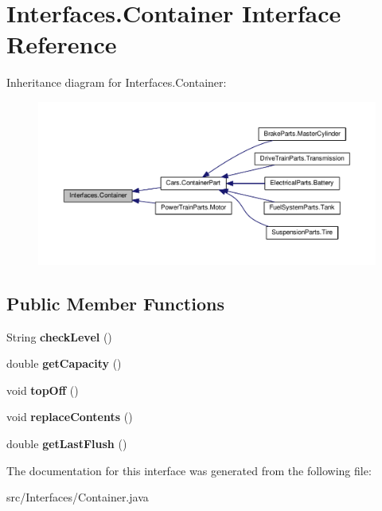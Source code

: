 \hypertarget{interfaceInterfaces_1_1Container}{}\section{Interfaces.\+Container Interface Reference}
\label{interfaceInterfaces_1_1Container}


Inheritance diagram for Interfaces.\+Container\+:
\nopagebreak
\begin{figure}[H]
\begin{center}
\leavevmode
\includegraphics[width=350pt]{interfaceInterfaces_1_1Container__inherit__graph}
\end{center}
\end{figure}
\subsection*{Public Member Functions}
\begin{DoxyCompactItemize}
\item 
\hypertarget{interfaceInterfaces_1_1Container_ac8ce4ee17f9add47e4b292451796eb0b}{}String {\bfseries check\+Level} ()\label{interfaceInterfaces_1_1Container_ac8ce4ee17f9add47e4b292451796eb0b}

\item 
\hypertarget{interfaceInterfaces_1_1Container_a96bed856ca707af69e01a1fc30fc24c4}{}double {\bfseries get\+Capacity} ()\label{interfaceInterfaces_1_1Container_a96bed856ca707af69e01a1fc30fc24c4}

\item 
\hypertarget{interfaceInterfaces_1_1Container_ac5211049926460d75c3adb0c577ee02b}{}void {\bfseries top\+Off} ()\label{interfaceInterfaces_1_1Container_ac5211049926460d75c3adb0c577ee02b}

\item 
\hypertarget{interfaceInterfaces_1_1Container_a99f4519821f22ff8da5d5f329300c622}{}void {\bfseries replace\+Contents} ()\label{interfaceInterfaces_1_1Container_a99f4519821f22ff8da5d5f329300c622}

\item 
\hypertarget{interfaceInterfaces_1_1Container_a1750d47ec1880c6fc2f1296a9d79a372}{}double {\bfseries get\+Last\+Flush} ()\label{interfaceInterfaces_1_1Container_a1750d47ec1880c6fc2f1296a9d79a372}

\end{DoxyCompactItemize}


The documentation for this interface was generated from the following file\+:\begin{DoxyCompactItemize}
\item 
src/\+Interfaces/Container.\+java\end{DoxyCompactItemize}
